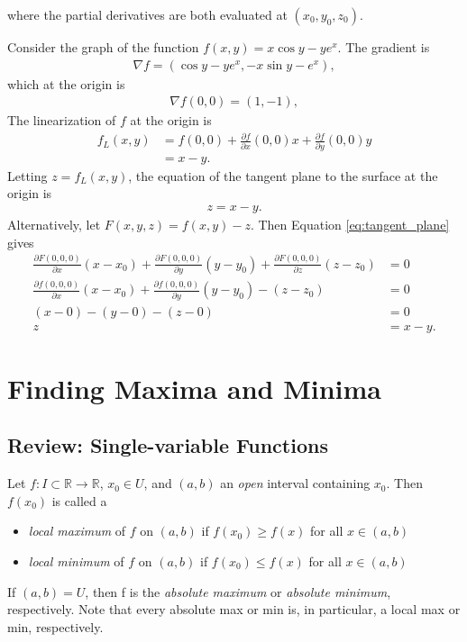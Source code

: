 \documentclass[12pt,letterpaper,reqno]{article}
\numberwithin{equation}{section}
\begin{document}
{where the partial derivatives are both evaluated at $(x_0,y_0,z_0)$.

\begin{example}
Consider the graph of the function $f(x,y)=x \cos y-ye^x$. The gradient is
\begin{align*}
	\nabla f=(\cos y-ye^x,-x\sin y-e^x),
\end{align*}
which at the origin is
\begin{align*}
	\nabla f(0,0)=(1,-1),
\end{align*}
The linearization of $f$ at the origin is
\begin{align*}
	f_L(x,y)&=f(0,0)+\frac{\partial f}{\partial x}(0,0)x+\frac{\partial f}{\partial y}(0,0)y \\
	&=x-y.
	\end{align*}
	Letting $z=f_L(x,y)$, the equation of the tangent plane to the surface at the origin is
	\begin{align*}
		z=x-y.
	\end{align*}
	Alternatively, let $F(x,y,z)=f(x,y)-z$. Then  Equation \ref{eq:tangent_plane} gives
	\begin{align*}
		\frac{\partial F(0,0,0)}{\partial x}(x-x_0)+\frac{\partial F(0,0,0)}{\partial y}(y-y_0)+\frac{\partial F(0,0,0)}{\partial z}(z-z_0)&=0 \\
		\frac{\partial f(0,0,0)}{\partial x}(x-x_0)+\frac{\partial f(0,0,0)}{\partial y}(y-y_0)-(z-z_0)&=0 \\
		(x-0)-(y-0)-(z-0)&=0 \\
		z&=x-y.
	\end{align*}
\end{example}

\section{Finding Maxima and Minima}
\subsection{Review: Single-variable Functions}
Let $f:I \subset \mathbb{R} \to \mathbb{R}$, $x_0 \in U$, and $(a,b)$ an \emph{open} interval containing $x_0$. Then $f(x_0)$ is called a 
\begin{itemize}
	\item \emph{local maximum} of $f$ on $(a,b)$ if $f(x_0) \geq f(x)$ for all $x \in (a,b)$
	\item \emph{local minimum} of $f$ on $(a,b)$ if $f(x_0) \leq f(x)$ for all $x \in (a,b)$
\end{itemize}
If $(a,b)=U$, then f is the \emph{absolute maximum} or \emph{absolute minimum}, respectively. Note that every absolute max or min is, in particular, a local max or min, respectively.

}
\end{document}
